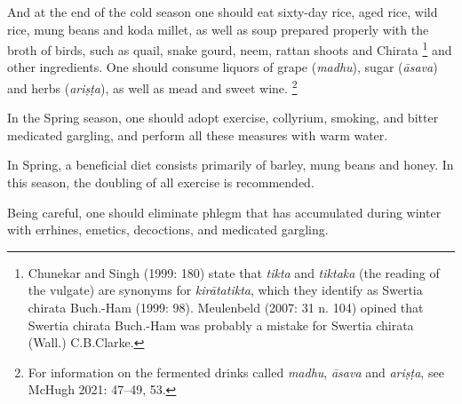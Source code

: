 \begin{translation}
And at the end of the cold season one should eat sixty-day rice, aged rice, %
wild rice, mung beans and koda millet, as well as soup prepared properly %
with the broth of birds, such as quail, %
snake gourd, neem, rattan shoots %
and Chirata%
    \footnote{Chunekar and Singh (1999: 180) state that \emph{tikta} and \emph{tiktaka} (the reading of the vulgate) are synonyms for \emph{kirātatikta}, which they identify as Swertia chirata Buch.-Ham (1999: 98). Meulenbeld (2007: 31 n. 104) opined that Swertia chirata Buch.-Ham was probably a mistake for Swertia chirata (Wall.) C.B.Clarke.}
and other ingredients. %
One should consume liquors of grape (\emph{madhu}), sugar (\emph{āsava}) and herbs (\emph{ariṣṭa}), as well as mead and sweet wine.%
    \footnote{For information on the fermented drinks called \emph{madhu}, \emph{āsava} and \emph{ariṣṭa}, see McHugh 2021: 47–49, 53.}

\item[46] 
In the Spring season,%
one should adopt exercise, collyrium, smoking, and bitter medicated gargling, %
and perform all these measures with warm water.  

\item[47] 
In Spring, a beneficial diet consists primarily of barley, mung beans and honey. In this season, the doubling of all exercise is recommended. 

\item[48] 
Being careful, one should eliminate phlegm that has accumulated during winter with errhines, %
emetics, decoctions, and medicated gargling.


\end{translation}

